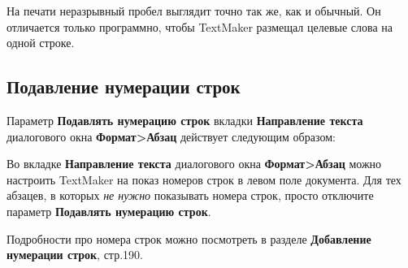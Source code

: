 \documentclass[a4paper,10pt]{article}
\begin{document}
На печати неразрывный пробел выглядит точно так же, как и обычный. Он отличается только программно, чтобы TextMaker размещал целевые слова на одной строке.

\subsection{Подавление нумерации строк}
Параметр \textbf{Подавлять нумерацию строк} вкладки \textbf{Направление текста} диалогового окна \textbf{Формат>Абзац} действует следующим образом:

Во вкладке \textbf{Направление текста} диалогового окна \textbf{Формат>Абзац} можно настроить TextMaker на показ номеров строк в левом поле документа. Для тех абзацев, в которых \textit{не нужно} показывать номера строк, просто отключите параметр \textbf{Подавлять нумерацию строк}.

Подробности про номера строк можно посмотреть в разделе \textbf{Добавление нумерации строк}, стр.190.
\end{document}
